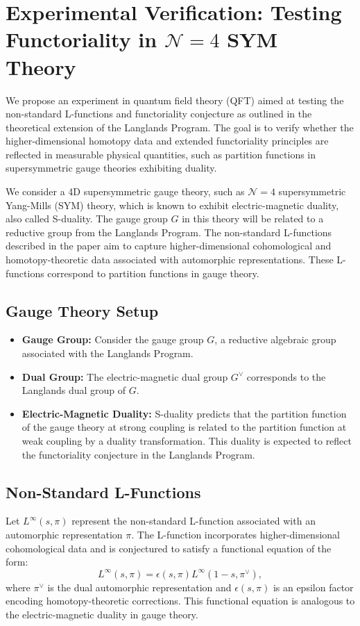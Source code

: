 \documentclass{article}
\theoremstyle{remark}
\begin{document}
\section{Experimental Verification: Testing Functoriality in $\mathcal{N}=4$ SYM Theory}


We propose an experiment in quantum field theory (QFT) aimed at testing the non-standard L-functions and functoriality conjecture as outlined in the theoretical extension of the Langlands Program. The goal is to verify whether the higher-dimensional homotopy data and extended functoriality principles are reflected in measurable physical quantities, such as partition functions in supersymmetric gauge theories exhibiting duality.

We consider a 4D supersymmetric gauge theory, such as $\mathcal{N}=4$ supersymmetric Yang-Mills (SYM) theory, which is known to exhibit electric-magnetic duality, also called S-duality. The gauge group $G$ in this theory will be related to a reductive group from the Langlands Program. The non-standard L-functions described in the paper aim to capture higher-dimensional cohomological and homotopy-theoretic data associated with automorphic representations. These L-functions correspond to partition functions in gauge theory.

\subsection{Gauge Theory Setup}
\begin{itemize}
    \item \textbf{Gauge Group:} Consider the gauge group $G$, a reductive algebraic group associated with the Langlands Program. 
    \item \textbf{Dual Group:} The electric-magnetic dual group $G^\vee$ corresponds to the Langlands dual group of $G$.
    \item \textbf{Electric-Magnetic Duality:} S-duality predicts that the partition function of the gauge theory at strong coupling is related to the partition function at weak coupling by a duality transformation. This duality is expected to reflect the functoriality conjecture in the Langlands Program.
\end{itemize}

\subsection{Non-Standard L-Functions}
Let $L^{\infty}(s, \pi)$ represent the non-standard L-function associated with an automorphic representation $\pi$. The L-function incorporates higher-dimensional cohomological data and is conjectured to satisfy a functional equation of the form:
\[
L^{\infty}(s, \pi) = \epsilon(s, \pi) L^{\infty}(1 - s, \pi^\vee),
\]
where $\pi^\vee$ is the dual automorphic representation and $\epsilon(s, \pi)$ is an epsilon factor encoding homotopy-theoretic corrections. This functional equation is analogous to the electric-magnetic duality in gauge theory.
\end{document}
